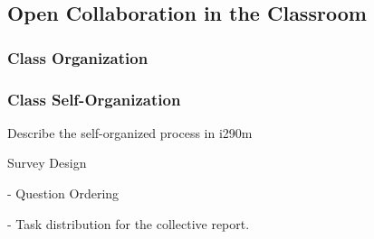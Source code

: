 \subsection{Open Collaboration in the Classroom}
\label{opencollaborationintheclassroom}


\subsubsection{Class Organization}


\subsubsection{Class Self-Organization}

Describe the self-organized process in  i290m

 Survey Design
 
 - Question Ordering
 
 - Task distribution for the collective report.
 
 